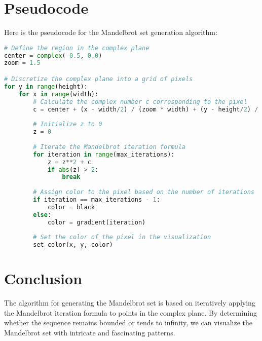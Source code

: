\documentclass{article}
\begin{document}
\section{Pseudocode}

Here is the pseudocode for the Mandelbrot set generation algorithm:

\begin{lstlisting}[language=Python]
# Define the region in the complex plane
center = complex(-0.5, 0.0)
zoom = 1.5

# Discretize the complex plane into a grid of pixels
for y in range(height):
    for x in range(width):
        # Calculate the complex number c corresponding to the pixel
        c = center + (x - width/2) / (zoom * width) + (y - height/2) / (zoom * height) * 1j
        
        # Initialize z to 0
        z = 0
        
        # Iterate the Mandelbrot iteration formula
        for iteration in range(max_iterations):
            z = z**2 + c
            if abs(z) > 2:
                break
        
        # Assign color to the pixel based on the number of iterations
        if iteration == max_iterations - 1:
            color = black
        else:
            color = gradient(iteration)
        
        # Set the color of the pixel in the visualization
        set_color(x, y, color)
\end{lstlisting}

\section{Conclusion}

The algorithm for generating the Mandelbrot set is based on iteratively applying the Mandelbrot iteration formula to points in the complex plane. By determining whether the sequence remains bounded or tends to infinity, we can visualize the Mandelbrot set with intricate and fascinating patterns.
\end{document}
